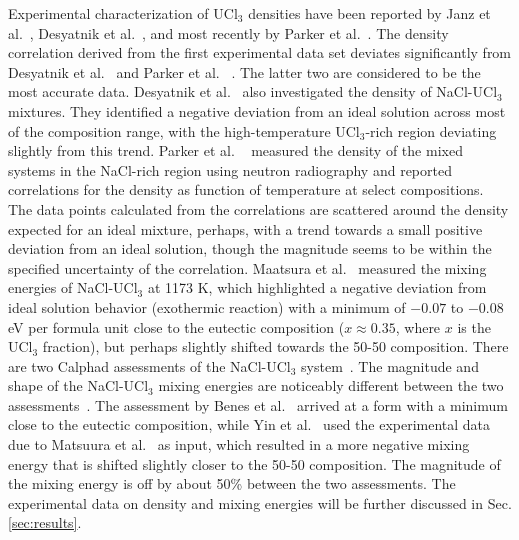\documentclass[preprint,3p,10pt,onecolumn,number,sort&compress]{elsarticle}
\begin{document}
Experimental characterization of UCl$_3$ densities have been reported by Janz et al.~\cite{Janz1988}, Desyatnik et al.~\cite{Desyatnik}, and most recently by Parker et al.~\cite{Parker}. The density correlation derived from the first experimental data set deviates significantly from Desyatnik et al.~\cite{Desyatnik} and Parker et al. ~\cite{Parker}. The latter two are considered to be the most accurate data.
Desyatnik et al.~\cite{Desyatnik} also investigated the density of NaCl-UCl$_3$ mixtures. They identified a negative deviation from an ideal solution across most of the composition range, with the high-temperature UCl$_3$-rich region deviating slightly from this trend. Parker et al. ~\cite{Parker} measured the density of the mixed systems in the NaCl-rich region using neutron radiography and reported correlations for the density as function of temperature at select compositions. The data points calculated from the correlations are scattered around the density expected for an ideal mixture, perhaps, with a trend towards a small positive deviation from an ideal solution, though the magnitude seems to be within the specified uncertainty of the correlation. 
Maatsura et al.~\cite{Matsuura} measured the mixing energies of NaCl-UCl$_3$ at 1173 K, which highlighted a negative deviation from ideal solution behavior (exothermic reaction) with a minimum of $-0.07$ to $-0.08$ eV per formula unit close to the eutectic composition ($x\approx 0.35$, where $x$ is the UCl$_3$ fraction), but perhaps slightly shifted towards the 50-50 composition. There are two Calphad assessments of the NaCl-UCl$_3$ system~\cite{BENES2008, YIN2020}. The magnitude and shape of the NaCl-UCl$_3$ mixing energies are noticeably different between the two assessments~\cite{YIN2020}. The assessment by Benes et al.~\cite{BENES2008} arrived at a form with a minimum close to the eutectic composition, while Yin et al.~\cite{YIN2020} used the experimental data due to Matsuura et al.~\cite{Matsuura} as input, which resulted in a more negative mixing energy that is shifted slightly closer to the 50-50 composition. The magnitude of the mixing energy is off by about 50\% between the two assessments. The experimental data on density and mixing energies will be further discussed in Sec. \ref{sec:results}.
\end{document}
